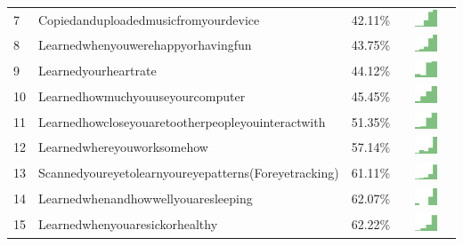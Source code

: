 \documentclass[a4paper,12pt]{article}
\begin{document}
\begin{longtable}{| p{0.5cm} | p{7cm} | p{1cm} | c |}
7 & Copiedanduploadedmusicfromyourdevice & 42.11\% & \includegraphics[width = 2cm, height = 0.5cm]{copiedanduploadedmusicfromyourdeviceWORKCONTACTS} \\  
8 & Learnedwhenyouwerehappyorhavingfun & 43.75\% & \includegraphics[width = 2cm, height = 0.5cm]{learnedwhenyouwerehappyorhavingfunWORKCONTACTS} \\  
9 & Learnedyourheartrate & 44.12\% & \includegraphics[width = 2cm, height = 0.5cm]{learnedyourheartrateWORKCONTACTS} \\  
10 & Learnedhowmuchyouuseyourcomputer & 45.45\% & \includegraphics[width = 2cm, height = 0.5cm]{learnedhowmuchyouuseyourcomputerWORKCONTACTS} \\  
11 & Learnedhowcloseyouaretootherpeopleyouinteractwith & 51.35\% & \includegraphics[width = 2cm, height = 0.5cm]{learnedhowcloseyouaretootherpeopleyouinteractwithWORKCONTACTS} \\  
12 & Learnedwhereyouworksomehow & 57.14\% & \includegraphics[width = 2cm, height = 0.5cm]{learnedwhereyouworksomehowWORKCONTACTS} \\  
13 & Scannedyoureyetolearnyoureyepatterns(Foreyetracking) & 61.11\% & \includegraphics[width = 2cm, height = 0.5cm]{scannedyoureyetolearnyoureyepatterns(foreyetracking)WORKCONTACTS} \\  
14 & Learnedwhenandhowwellyouaresleeping & 62.07\% & \includegraphics[width = 2cm, height = 0.5cm]{learnedwhenandhowwellyouaresleepingWORKCONTACTS} \\  
15 & Learnedwhenyouaresickorhealthy & 62.22\% & \includegraphics[width = 2cm, height = 0.5cm]{learnedwhenyouaresickorhealthyWORKCONTACTS} \\  

\end{longtable}
\end{document}
